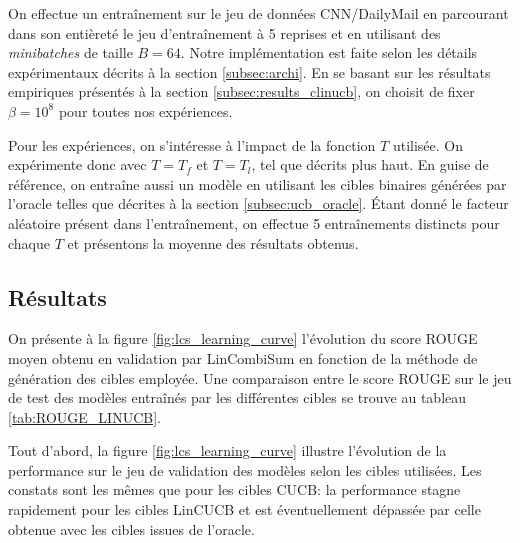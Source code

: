 On effectue un entraînement sur le jeu de données CNN/DailyMail en 
parcourant dans son entièreté le jeu d'entraînement à 5 reprises
et en utilisant des \textit{minibatches} de taille $B=64$.
Notre implémentation est faite selon les détails expérimentaux décrits à la section 
\ref{subsec:archi}.
En se basant sur les résultats empiriques présentés à la section \ref{subsec:results_clinucb},
on choisit de fixer $\beta=10^8$ pour toutes nos expériences.

Pour les expériences, on s'intéresse à
l'impact de la fonction $T$ utilisée.
On expérimente donc avec $T = T_f$ et $T=T_l$,
tel que décrits plus haut.
En guise de référence, on entraîne aussi un modèle 
en utilisant les cibles binaires générées par l'oracle telles que décrites
à la section \ref{subsec:ucb_oracle}.
Étant donné le facteur aléatoire présent dans l'entraînement, on effectue 
5 entraînements distincts pour chaque $T$ et présentons la moyenne
des résultats obtenus.

\subsection{Résultats}

On présente à la figure \ref{fig:lcs_learning_curve} l'évolution 
du score ROUGE moyen obtenu en validation par LinCombiSum en fonction de la méthode
de génération des cibles employée. 
Une comparaison entre le score ROUGE sur le jeu de test des modèles entraînés 
par les différentes cibles se trouve au tableau \ref{tab:ROUGE_LINUCB}.

Tout d'abord, la figure \ref{fig:lcs_learning_curve} illustre l'évolution 
de la performance sur le jeu de validation des modèles selon 
les cibles utilisées.
Les constats sont les mêmes que pour les cibles CUCB: la performance 
stagne rapidement pour les cibles LinCUCB et est éventuellement 
dépassée par celle obtenue avec les cibles issues de l'oracle.

